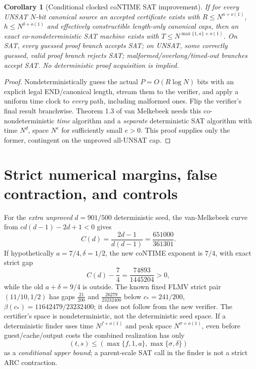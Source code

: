 \documentclass[11pt]{article}
\newtheorem{corollary}[theorem]{Corollary}
\begin{document}
\begin{corollary}[Conditional clocked coNTIME SAT improvement]
If for \emph{every} UNSAT \(N\)-bit canonical source an accepted certificate exists with \(R\le N^{a+o(1)}\), \(h\le N^{\delta+o(1)}\) and effectively constructible \emph{length-only} canonical caps, then an exact co-nondeterministic SAT machine exists with \(T\le N^{\max\{1,a\}+o(1)}\). On SAT, every guessed proof branch \emph{accepts SAT}; on UNSAT, some correctly guessed, valid proof branch \emph{rejects SAT}; malformed/overlong/timed-out branches accept SAT. No deterministic proof acquisition is implied.
\end{corollary}
\begin{proof}
Nondeterministically guess the actual \(P=O(R\log N)\) bits with an explicit legal END/canonical length, stream them to the verifier, and apply a uniform time clock to \emph{every} path, including malformed ones. Flip the verifier's final result branchwise. Theorem 1.3 of van Melkebeek needs this co-nondeterministic \emph{time} algorithm and a \emph{separate} deterministic SAT algorithm with time \(N^d\), space \(N^e\) for sufficiently small \(e>0\). This proof supplies only the former, contingent on the unproved all-UNSAT cap.
\end{proof}

\section{Strict numerical margins, false contraction, and controls}
For the \emph{extra unproved} \(d=901/500\) deterministic seed, the van-Melkebeek curve from \(cd(d-1)-2d+1<0\) gives
\[
C(d)=\frac{2d-1}{d(d-1)}=\frac{651000}{361301}.
\]
If hypothetically \(a=7/4,\delta=1/2\), the new coNTIME exponent is \(7/4\), with exact strict gap
\[
C(d)-\frac74=\frac{74893}{1445204}>0,
\]
while the old \(a+\delta=9/4\) is outside. The known fixed FLMV strict pair \((11/10,1/2)\) has gaps \(\frac{21}{200}\) and \(\frac{26279}{23232400}\) below \(c_*=241/200\), \(\beta(c_*)=11642479/23232400\); it does not follow from the new verifier. The certifier's space is nondeterministic, not the deterministic seed space. If a deterministic finder uses time \(N^{f+o(1)}\) and peak space \(N^{\sigma+o(1)}\), even before guest/cache/output costs the combined realization has only
\[
(t,s)\le(\max\{f,1,a\},\max\{\sigma,\delta\})
\]
as a \emph{conditional upper bound}; a parent-scale SAT call in the finder is not a strict ARC contraction.
\end{document}
